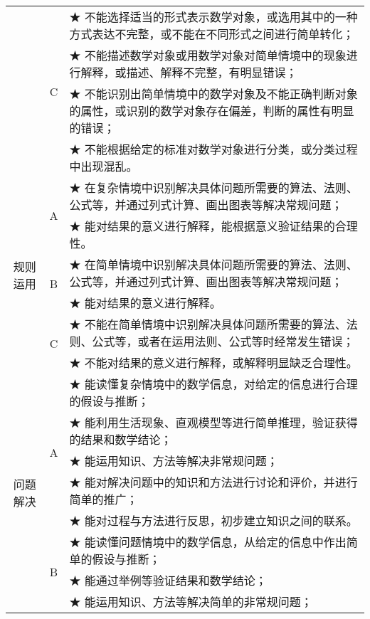 \begin{itshape}
\begin{longtable}{|c|c|p{12cm}|}
   &   \multirow{4}{*}{C}  &  ★ 不能选择适当的形式表示数学对象，或选用其中的一种方式表达不完整，或不能在不同形式之间进行简单转化；\\  
   & &  ★ 不能描述数学对象或用数学对象对简单情境中的现象进行解释，或描述、解释不完整，有明显错误；\\  
   & &  ★ 不能识别出简单情境中的数学对象及不能正确判断对象的属性，或识别的数学对象存在偏差，判断的属性有明显的错误； \\   
   & &  ★ 不能根据给定的标准对数学对象进行分类，或分类过程中出现混乱。 \\   
\hline
   
   \multirow{6}{*}{规则运用}  & \multirow{2}{*}{A}  & ★   在复杂情境中识别解决具体问题所需要的算法、法则、公式等，并通过列式计算、画出图表等解决常规问题； \\    
   & &  ★ 能对结果的意义进行解释，能根据意义验证结果的合理性。 \\   
\cline{2-3}      

   &   \multirow{2}{*}{B}  &  ★ 在简单情境中识别解决具体问题所需要的算法、法则、公式等，并通过列式计算、画出图表等解决常规问题；\\  
   & &  ★   能对结果的意义进行解释。\\   
\cline{2-3}      

   &   \multirow{2}{*}{C}  &  ★ 不能在简单情境中识别解决具体问题所需要的算法、法则、公式等，或者在运用法则、公式等时经常发生错误；\\  
   & &  ★ 不能对结果的意义进行解释，或解释明显缺乏合理性。\\  
\hline
   
   \multirow{13}{*}{问题解决}  & \multirow{5}{*}{A}  & ★ 能读懂复杂情境中的数学信息，对给定的信息进行合理的假设与推断； \\    
   & &  ★ 能利用生活现象、直观模型等进行简单推理，验证获得的结果和数学结论； \\  
   & &  ★ 能运用知识、方法等解决非常规问题；\\    
   & &  ★ 能对解决问题中的知识和方法进行讨论和评价，并进行简单的推广；\\  
   & &  ★ 能对过程与方法进行反思，初步建立知识之间的联系。\\    
\cline{2-3}      

   &   \multirow{4}{*}{B}  &  ★ 能读懂问题情境中的数学信息，从给定的信息中作出简单的假设与推断；\\  
   & &  ★   能通过举例等验证结果和数学结论；\\  
   & &  ★ 能运用知识、方法等解决简单的非常规问题； \\   
   

\end{longtable}
\end{itshape}
